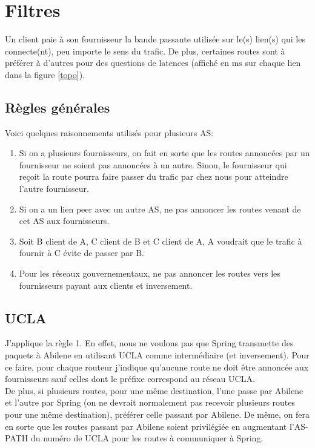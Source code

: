 \documentclass[a4paper, 12pt]{article}
\begin{document}
\section{Filtres}
Un client paie à son fournisseur la bande passante utilisée sur le(s) lien(s) qui les connecte(nt), peu importe le sens du trafic.
De plus, certaines routes sont à préférer à d'autres pour des questions de latences (affiché en ms sur chaque lien dans la figure \ref{topo}).
\subsection{Règles générales}
Voici quelques raisonnements utilisés pour plusieurs AS:
\begin{enumerate}
 \item Si on a plusieurs fournisseurs, on fait en sorte que les routes annoncées par un fournisseur ne soient pas annoncées à un autre.
 Sinon, le fournisseur qui reçoit la route pourra faire passer du trafic par chez nous pour atteindre l'autre fournisseur.
 \item Si on a un lien peer avec un autre AS, ne pas annoncer les routes venant de cet AS aux fournisseurs.
 \item Soit B client de A, C client de B et C client de A, A voudrait que le trafic à fournir à C évite de passer par B. %
 \item Pour les réseaux gouvernementaux, ne pas annoncer les routes vers les fournisseurs payant aux clients et inversement.
\end{enumerate}

\subsection{UCLA}
J'applique la règle 1.
En effet, nous ne voulons pas que Spring transmette des paquets à Abilene en utilisant UCLA comme intermédiaire (et inversement).
Pour ce faire, pour chaque routeur j'indique qu'aucune route ne doit être annoncée aux fournisseurs sauf celles dont le préfixe correspond au réseau UCLA.
\\

De plus, si plusieurs routes, pour une même destination, l'une passe par Abilene et l'autre par Spring (on ne devrait normalement pas recevoir plusieurs routes pour une même destination), préférer celle passant par Abilene.
De même, on fera en sorte que les routes passant par Abilene soient privilégiée en augmentant l'AS-PATH du numéro de UCLA pour les routes à communiquer à Spring.
\end{document}
